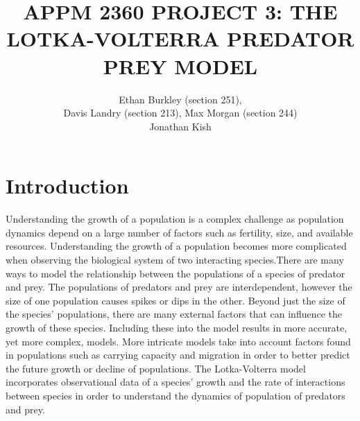 \documentclass[12pt]{article}   %
\theoremstyle{definition}
\numberwithin{equation}{section}
\begin{document}
\parskip10pt
\parindent0pt
\baselineskip15pt


\title{APPM 2360 PROJECT 3: THE LOTKA-VOLTERRA PREDATOR PREY MODEL}
\author{Ethan Burkley (section 251), \\ Davis Landry (section 213), Max Morgan (section 244) \\ Jonathan Kish}


\pagestyle{fancy}
\renewcommand{\sectionmark}[1]{\markright{#1}{}}

\fancyhf{}

\rhead{\fancyplain{}{\thepage}} %
\lhead{\fancyplain{}{\rightmark }} %

\maketitle

\newpage
{}
\setcounter{page}{2}

\section{Introduction} \label{APPM2360proj01sec01}
\quad Understanding the growth of a population is a complex challenge as population dynamics depend on a large number of factors such as fertility, size, and available resources. Understanding the growth of a population becomes more complicated when observing the biological system of two interacting species.There are many ways to model the relationship between the populations of a species of predator and prey. The populations of predators and prey are interdependent, however the size of one population causes spikes or dips in the other. Beyond just the size of the species' populations, there are many external factors that can influence the growth of these species. Including these into the model results in more accurate, yet more complex, models. More intricate models take into account factors found in populations such as carrying capacity and migration in order to better predict the future growth or decline of populations. The Lotka-Volterra model incorporates observational data of a species' growth and the rate of interactions between species in order to understand the dynamics of population of predators and prey. 

\setcounter{page}{1}
\end{document}

